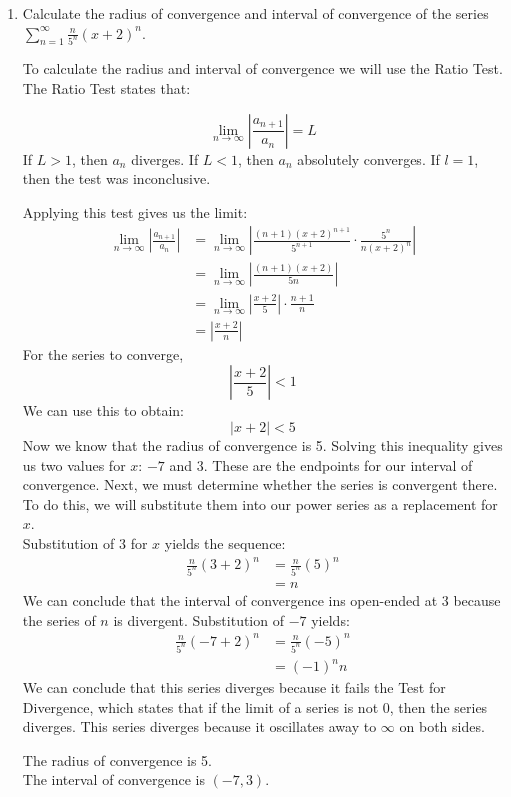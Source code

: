 \documentclass{article}
\begin{document}
\begin{enumerate}[label=\textbf{(13.\arabic*)}]

\item Calculate the radius of convergence and interval of convergence of the series $\displaystyle \sum_{n=1}^\infty \frac{n}{5^n}(x+2)^n$.

To calculate the radius and interval of convergence we will use the Ratio Test. The Ratio Test states that:
\begin{center}
\vspace{-10pt}
\[\lim_{n\to\infty} \left|\frac{a_{n+1}}{a_n}\right|=L\]
If $L>1$, then $a_n$ diverges.
If $L<1$, then $a_n$ absolutely converges.
If $l=1$, then the test was inconclusive.
\end{center}
Applying this test gives us the limit:
\begin{align*}
\lim_{n\to\infty} \left|\frac{a_{n+1}}{a_n}\right| &= \lim_{n\to\infty} \left|\frac{(n+1)(x+2)^{n+1}}{5^{n+1}}\cdot\frac{5^n}{n(x+2)^n}\right|\\
&= \lim_{n\to\infty} \left|\frac{(n+1)(x+2)}{5n}\right|\\
&= \lim_{n\to\infty} \left|\frac{x+2}{5}\right|\cdot\frac{n+1}{n}\\
&= \left|\frac{x+2}{n}\right|
\end{align*}
For the series to converge, 
\[\left|\frac{x+2}{5}\right|<1\]
We can use this to obtain:
\[\left|x+2\right|<5\]
Now we know that the radius of convergence is 5. Solving this inequality gives us two values for $x$: $-7$ and $3$. These are the endpoints for our interval of convergence. Next, we must determine whether the series is convergent there. To do this, we will substitute them into our power series as a replacement for $x$.\\
Substitution of $3$ for $x$ yields the sequence:
\begin{align*}
\frac{n}{5^n}(3+2)^n &=  \frac{n}{5^n}(5)^n\\
&= n
\end{align*}
We can conclude that the interval of convergence ins open-ended at $3$ because the series of $n$ is divergent. Substitution of $-7$ yields:
\begin{align*}
\frac{n}{5^n}(-7+2)^n &=  \frac{n}{5^n}(-5)^n\\
&= (-1)^nn
\end{align*}
We can conclude that this series diverges because it fails the  Test for Divergence, which states that if the limit of a series is not 0, then the series diverges. This series diverges because it oscillates away to $\infty$ on both sides.
\begin{center}
The radius of convergence is 5.\\
The interval of convergence is $(-7,3)$.
\end{center}


\end{enumerate}
\end{document}

